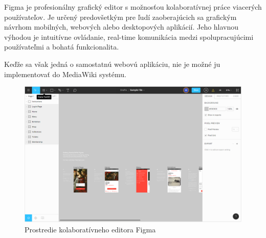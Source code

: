 Figma je profesionálny grafický editor s možnosťou kolaboratívnej práce viacerých používateľov. Je určený predovšetkým pre ľudí zaoberajúcich sa grafickým návrhom mobilných, webových alebo desktopových aplikácií. Jeho hlavnou výhodou je intuitívne ovládanie, real-time komunikácia medzi spolupracujúcimi používateľmi a bohatá funkcionalita. 

Keďže sa však jedná o samostatnú webovú aplikáciu, nie je možné ju implementovať do MediaWiki systému.

\begin{figure}[h]
	\centerline{\includegraphics[width=1\textwidth]{images/figma}}
	\caption[Editor Figma]{Prostredie kolaboratívneho editora Figma}
	\label{obr:Figma}
\end{figure}
\FloatBarrier

